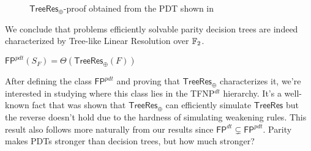 \begin{figure}[H]
    \centering
    

    \caption{$\mathsf{TreeRes}_\oplus$-proof obtained from the PDT shown in }
\end{figure}

We conclude that problems efficiently solvable parity decision trees are indeed characterized by Tree-like Linear Resolution over $\mathbb{F}_2$.

\begin{theorem}
    $\mathsf{FP}^{pdt}(S_F) = \Theta(\mathsf{TreeRes}_\oplus(F))$
\end{theorem}

After defining the class $\mathsf{FP}^{pdt}$ and proving that $\mathsf{TreeRes}_\oplus$ characterizes it, we're interested in studying where this class lies in the \textsf{TFNP}$^{dt}$ hierarchy. It's a well-known fact that was shown that $\mathsf{TreeRes}_\oplus$ can efficiently simulate $\mathsf{TreeRes}$ but the reverse doesn't hold due to the hardness of simulating weakening rules. This result also follows more naturally from our results since $\mathsf{FP}^{dt} \subsetneq \mathsf{FP}^{pdt}$. Parity makes PDTs stronger than decision trees, but how much stronger?

